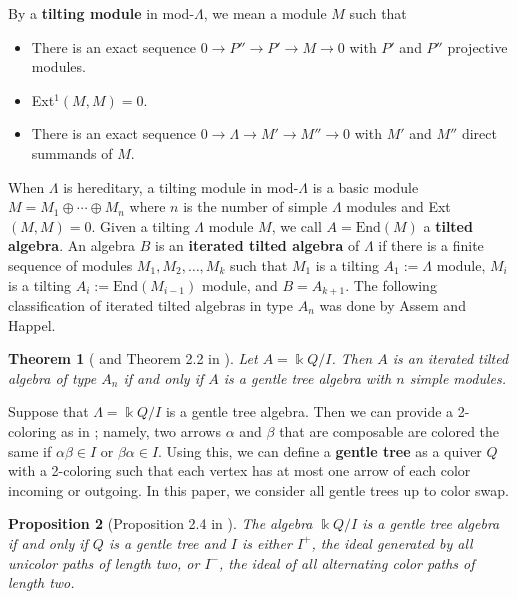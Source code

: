 \documentclass[12pt]{amsart}
\newtheorem{thm}{Theorem}[section]
\newtheorem{prop}[thm]{Proposition}
\theoremstyle{definition}
\theoremstyle{remark}
\numberwithin{equation}{section}
\newcommand{\kk}{\ensuremath{\Bbbk}}
\begin{document}
By a \textbf{tilting module} in mod-$\Lambda$, we mean a module $M$ such that 
\begin{itemize}
    \item There is an exact sequence $0\rightarrow P'' \rightarrow P' \rightarrow M \rightarrow 0$ with $P'$ and $P''$ projective modules.
    \item Ext$^1(M,M) = 0$.
    \item There is an exact sequence $0\rightarrow \Lambda \rightarrow M' \rightarrow M'' \rightarrow 0$ with $M'$ and $M''$ direct summands of $M$.
\end{itemize}

When $\Lambda$ is hereditary, a tilting module in mod-$\Lambda$ is a basic module $M = M_1 \oplus \cdots \oplus M_n$ where $n$ is the number of simple $\Lambda$ modules and Ext$(M,M) = 0$. Given a tilting $\Lambda$ module $M$, we call $A = \text{End}(M)$ a \textbf{tilted algebra}. An algebra $B$ is an \textbf{iterated tilted algebra} of $\Lambda$ if there is a finite sequence of modules $M_1, M_2, \dots, M_k$ such that $M_1$ is a tilting $A_1 := \Lambda$ module, $M_i$ is a tilting $A_{i} := \text{End}(M_{i-1})$ module, and $B = A_{k+1}$. The following classification of iterated tilted algebras in type $A_n$ was done by Assem and Happel.

\begin{thm}[\cite{assem1981generalized} and Theorem 2.2 in \cite{qiu2013ext}] \label{thm: assem happel classification}
    Let $A = \kk Q/I$. Then $A$ is an iterated tilted algebra of type $A_n$ if and only if $A$ is a gentle tree algebra with $n$ simple modules.
\end{thm}

Suppose that $\Lambda = \kk Q/I$ is a gentle tree algebra. Then we can provide a 2-coloring as in \cite{qiu2013ext}; namely, two arrows $\alpha$ and $\beta$ that are composable are colored the same if $\alpha\beta \in I$ or $\beta\alpha\in I$. Using this, we can define a \textbf{gentle tree} as a quiver $Q$ with a 2-coloring such that each vertex has at most one arrow of each color incoming or outgoing. In this paper, we consider all gentle trees up to color swap.

\begin{prop}[Proposition 2.4 in \cite{qiu2013ext}]\label{prop: coloring classification}
    The algebra $\kk Q/I$ is a gentle tree algebra if and only if $Q$ is a gentle tree and $I$ is either $I^+$, the ideal generated by all unicolor paths of length two, or $I^-$, the ideal of all alternating color paths of length two.
\end{prop}
\end{document}
